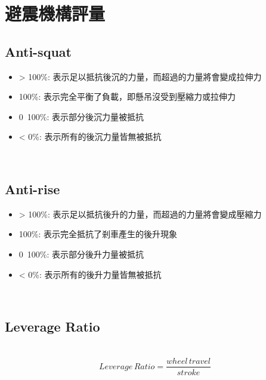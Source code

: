 \documentclass[14pt,a4paper]{report}  %
\newcommand{\fourteen}{\fontsize{14pt}{\baselineskip}\selectfont}%
\begin{document}
{      \section{避震機構評量}
      \subsection{Anti-squat}
      \fourteen {當加速時因不同騎乘姿勢導致的重心位置變化而產生的力量轉移會讓懸架受壓縮力，而Anti-squat即為抵抗此後沉的能力。}
       \begin{itemize}
       \item > 100\%: 表示足以抵抗後沉的力量，而超過的力量將會變成拉伸力
       \item 100\%: 表示完全平衡了負載，即懸吊沒受到壓縮力或拉伸力
       \item 0~100\%: 表示部分後沉力量被抵抗
       \item < 0\%: 表示所有的後沉力量皆無被抵抗
       \end{itemize}
       \hspace*{\fill} \\
       \subsection{Anti-rise}
       \fourteen {在剎車的時候因為力量轉移的關係導致後輪產生升起的情況，而Anti-rise即為抵抗此後升現象的能力。}
       \begin{itemize}
       \item > 100\%: 表示足以抵抗後升的力量，而超過的力量將會變成壓縮力
       \item 100\%: 表示完全抵抗了剎車產生的後升現象
       \item 0~100\%: 表示部分後升力量被抵抗
       \item < 0\%: 表示所有的後升力量皆無被抵抗
       \end{itemize}
       \hspace*{\fill} \\
       \subsection{Leverage Ratio}
       \fourteen {Leverage ratio是避震器壓縮量和後輪行程的比值，當較大的槓桿比率會對避震器產生較大的衝擊，而在騎乘時對於地形變化的感受度較不敏感，相反地較小的槓桿比率對於地形的敏感度較高。其計算方式如下所示。}
       \hspace*{\fill} \\
       \begin{equation}
       Leverage\, Ratio = \frac{wheel\,travel}{stroke}
       \end{equation}
       \hspace*{\fill} \\
}
\end{document}
